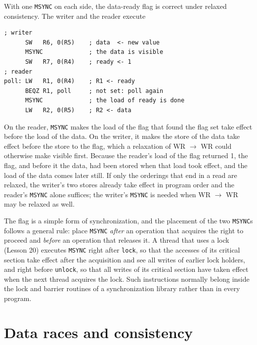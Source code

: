\documentclass[../main.tex]{subfiles}
\begin{document}
With one \texttt{MSYNC} on each side, the data-ready flag is correct under
relaxed consistency.  The writer and the reader execute
\begin{lstlisting}[language={[x86masm]Assembler}, numbers=none]
; writer
      SW   R6, 0(R5)    ; data  <- new value
      MSYNC             ; the data is visible
      SW   R7, 0(R4)    ; ready <- 1
; reader
poll: LW   R1, 0(R4)    ; R1 <- ready
      BEQZ R1, poll     ; not set: poll again
      MSYNC             ; the load of ready is done
      LW   R2, 0(R5)    ; R2 <- data
\end{lstlisting}
On the reader, \texttt{MSYNC} makes the load of the flag that found the flag
set take effect before the load of the data.  On the writer, it makes the
store of the data take effect before the store to the flag, which a
relaxation of WR $\to$ WR could otherwise make visible first.  Because the
reader's load of the flag returned 1, the flag, and before it the data, had
been stored when that load took effect, and the load of the data comes later
still.  If only the orderings that end in a read are relaxed, the writer's two
stores already take effect in program order and the reader's \texttt{MSYNC}
alone suffices; the writer's \texttt{MSYNC} is needed when WR $\to$ WR may be
relaxed as well.

The flag is a simple form of synchronization, and the placement of the two
\texttt{MSYNC}s follows a general rule: place \texttt{MSYNC} \emph{after} an
operation that acquires the right to proceed and \emph{before} an operation
that releases it.  A
thread that uses a lock (Lesson 20) executes
\texttt{MSYNC} right after \texttt{lock}, so that the accesses of its critical
section take effect after the acquisition and see all writes of earlier lock
holders, and right before \texttt{unlock}, so that all writes of its critical
section have taken effect when the next thread acquires the lock.  Such
instructions normally belong inside the lock and barrier routines of a
synchronization library rather than in every program.

\section{Data races and consistency}
\label{sec:l21-races}
\end{document}
